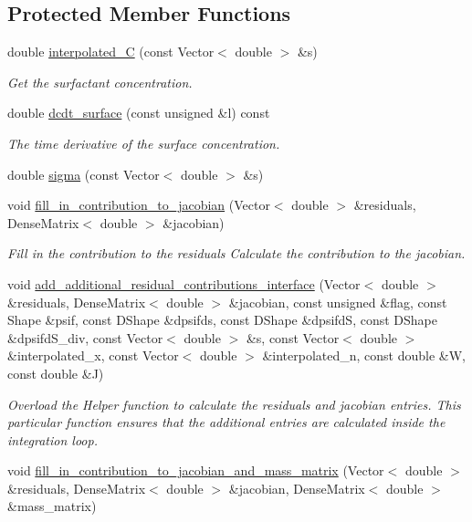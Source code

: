 \subsection*{Protected Member Functions}
\begin{DoxyCompactItemize}
\item 
double \hyperlink{classoomph_1_1SpineAxisymmetricMarangoniSurfactantFluidInterfaceElement_a8f0df8c1e9120011fa51b15ab2694d34}{interpolated\+\_\+C} (const Vector$<$ double $>$ \&s)
\begin{DoxyCompactList}\small\item\em Get the surfactant concentration. \end{DoxyCompactList}\item 
double \hyperlink{classoomph_1_1SpineAxisymmetricMarangoniSurfactantFluidInterfaceElement_a7ee3faea2d8e082efde048e7adb9e9c1}{dcdt\+\_\+surface} (const unsigned \&l) const
\begin{DoxyCompactList}\small\item\em The time derivative of the surface concentration. \end{DoxyCompactList}\item 
double \hyperlink{classoomph_1_1SpineAxisymmetricMarangoniSurfactantFluidInterfaceElement_a7312e78a1b5449ea2ff6d856a4fd9c46}{sigma} (const Vector$<$ double $>$ \&s)
\item 
void \hyperlink{classoomph_1_1SpineAxisymmetricMarangoniSurfactantFluidInterfaceElement_aa34b8b5ac73054e367fd321bf1ae6346}{fill\+\_\+in\+\_\+contribution\+\_\+to\+\_\+jacobian} (Vector$<$ double $>$ \&residuals, Dense\+Matrix$<$ double $>$ \&jacobian)
\begin{DoxyCompactList}\small\item\em Fill in the contribution to the residuals Calculate the contribution to the jacobian. \end{DoxyCompactList}\item 
void \hyperlink{classoomph_1_1SpineAxisymmetricMarangoniSurfactantFluidInterfaceElement_a56c90572b8969dff01a4baa9de850d91}{add\+\_\+additional\+\_\+residual\+\_\+contributions\+\_\+interface} (Vector$<$ double $>$ \&residuals, Dense\+Matrix$<$ double $>$ \&jacobian, const unsigned \&flag, const Shape \&psif, const D\+Shape \&dpsifds, const D\+Shape \&dpsifdS, const D\+Shape \&dpsifd\+S\+\_\+div, const Vector$<$ double $>$ \&s, const Vector$<$ double $>$ \&interpolated\+\_\+x, const Vector$<$ double $>$ \&interpolated\+\_\+n, const double \&W, const double \&J)
\begin{DoxyCompactList}\small\item\em Overload the Helper function to calculate the residuals and jacobian entries. This particular function ensures that the additional entries are calculated inside the integration loop. \end{DoxyCompactList}\item 
void \hyperlink{classoomph_1_1SpineAxisymmetricMarangoniSurfactantFluidInterfaceElement_ab8e6a649149c0e1aadb95dc820b8be86}{fill\+\_\+in\+\_\+contribution\+\_\+to\+\_\+jacobian\+\_\+and\+\_\+mass\+\_\+matrix} (Vector$<$ double $>$ \&residuals, Dense\+Matrix$<$ double $>$ \&jacobian, Dense\+Matrix$<$ double $>$ \&mass\+\_\+matrix)
\end{DoxyCompactItemize}
